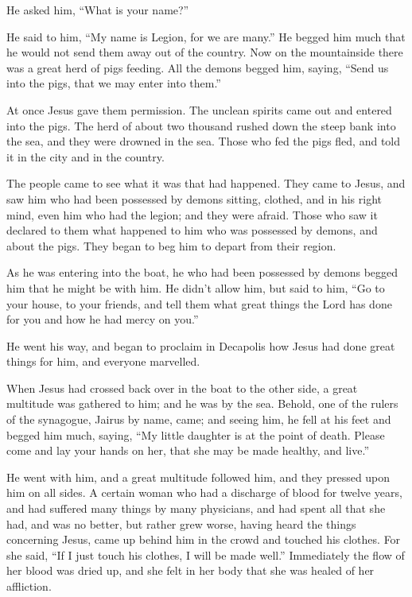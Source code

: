  He asked him, ``What is your name?''

He said to him, ``My name is Legion, for we are many.''  He
begged him much that he would not send them away out of the country.
 Now on the mountainside there was a great herd of pigs
feeding.  All the demons begged him, saying, ``Send us into
the pigs, that we may enter into them.''

 At once Jesus gave them permission. The unclean spirits
came out and entered into the pigs. The herd of about two thousand
rushed down the steep bank into the sea, and they were drowned in the
sea.  Those who fed the pigs fled, and told it in the city
and in the country.

The people came to see what it was that had happened.  They
came to Jesus, and saw him who had been possessed by demons sitting,
clothed, and in his right mind, even him who had the legion; and they
were afraid.  Those who saw it declared to them what
happened to him who was possessed by demons, and about the pigs.
 They began to beg him to depart from their region.

 As he was entering into the boat, he who had been
possessed by demons begged him that he might be with him. 
He didn't allow him, but said to him, ``Go to your house, to your
friends, and tell them what great things the Lord has done for you and
how he had mercy on you.''

 He went his way, and began to proclaim in Decapolis how
Jesus had done great things for him, and everyone marvelled.

 When Jesus had crossed back over in the boat to the other
side, a great multitude was gathered to him; and he was by the sea.
 Behold, one of the rulers of the synagogue, Jairus by
name, came; and seeing him, he fell at his feet  and begged
him much, saying, ``My little daughter is at the point of death. Please
come and lay your hands on her, that she may be made healthy, and
live.''

 He went with him, and a great multitude followed him, and
they pressed upon him on all sides.  A certain woman who
had a discharge of blood for twelve years,  and had
suffered many things by many physicians, and had spent all that she had,
and was no better, but rather grew worse,  having heard the
things concerning Jesus, came up behind him in the crowd and touched his
clothes.  For she said, ``If I just touch his clothes, I
will be made well.''  Immediately the flow of her blood was
dried up, and she felt in her body that she was healed of her
affliction.

